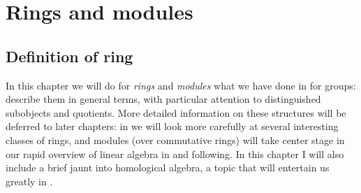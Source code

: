 \chapter{Rings and modules}
\label{chap:rings}


\section{Definition of ring}
\label{sec:rings:definition-of-ring}

In this chapter we will do for \emph{rings} and \emph{modules} what we
have done in  for groups: describe them in general
terms, with particular attention to distinguished subobjects and
quotients. More detailed information on these structures will be
deferred to later chapters: in  we will look more
carefully at several interesting classes of rings, and modules (over
commutative rings) will take center stage in our rapid overview of
linear algebra in  and following. In this chapter I
will also include a brief jaunt into homological algebra, a topic that
will entertain us greatly in .

